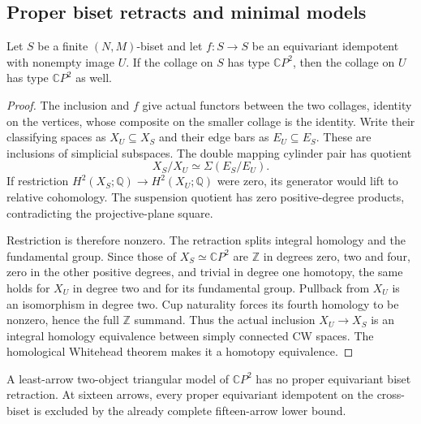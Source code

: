 \subsection{Proper biset retracts and minimal models}

\begin{lemma}
\label{C:proper-biset-retract-CP2}
Let $S$ be a finite $(N,M)$-biset and let $f:S\to S$ be an
equivariant idempotent with nonempty image $U$.  If the collage
on $S$ has type $\mathbb CP^2$, then the collage on $U$ has
type $\mathbb CP^2$ as well.
\end{lemma}
\begin{proof}
The inclusion and $f$ give actual functors between the two
collages, identity on the vertices, whose composite on the
smaller collage is the identity.  Write their classifying
spaces as $X_U\subseteq X_S$ and their edge bars as
$E_U\subseteq E_S$.  These are inclusions of simplicial
subspaces.  The double mapping cylinder pair has quotient
\[
 X_S/X_U\simeq\Sigma(E_S/E_U).
\]
If restriction $H^2(X_S;\mathbb Q)\to H^2(X_U;\mathbb Q)$
were zero, its generator would lift to relative cohomology.
The suspension quotient has zero positive-degree products,
contradicting the projective-plane square.

Restriction is therefore nonzero.  The retraction splits
integral homology and the fundamental group.  Since those of
$X_S\simeq\mathbb CP^2$ are $\mathbb Z$ in degrees zero,
two and four, zero in the other positive degrees, and trivial
in degree one homotopy, the same holds for $X_U$ in degree two
and for its fundamental group.  Pullback from $X_U$ is an
isomorphism in degree two.  Cup naturality forces its fourth
homology to be nonzero, hence the full $\mathbb Z$ summand.
Thus the actual inclusion $X_U\to X_S$ is an integral
homology equivalence between simply connected CW spaces.
The homological Whitehead theorem makes it a homotopy
equivalence.
\end{proof}

\begin{corollary}\label{C:biset-core-prune}
A least-arrow two-object triangular model of $\mathbb CP^2$
has no proper equivariant biset retraction.  At sixteen arrows,
every proper equivariant idempotent on the cross-biset is
excluded by the already complete fifteen-arrow lower bound.
\end{corollary}

